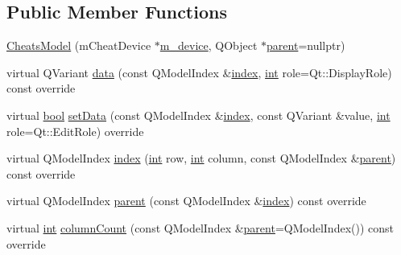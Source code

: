 \subsection*{Public Member Functions}
\begin{DoxyCompactItemize}
\item 
\mbox{\hyperlink{class_q_g_b_a_1_1_cheats_model_ad36f22766ac53d178fde4ec024a56b49}{Cheats\+Model}} (m\+Cheat\+Device $\ast$\mbox{\hyperlink{class_q_g_b_a_1_1_cheats_model_ac06665c1e57cc1b07916887eef1e0352}{m\+\_\+device}}, Q\+Object $\ast$\mbox{\hyperlink{class_q_g_b_a_1_1_cheats_model_a4afdb0b4cf8e3ee616a79ad63bb2e98b}{parent}}=nullptr)
\item 
virtual Q\+Variant \mbox{\hyperlink{class_q_g_b_a_1_1_cheats_model_a694bb3a5ce6c06b6507c230c0a7518b7}{data}} (const Q\+Model\+Index \&\mbox{\hyperlink{class_q_g_b_a_1_1_cheats_model_a55247862e978913005dfae95e0f3753c}{index}}, \mbox{\hyperlink{ioapi_8h_a787fa3cf048117ba7123753c1e74fcd6}{int}} role=Qt\+::\+Display\+Role) const override
\item 
virtual \mbox{\hyperlink{libretro_8h_a4a26dcae73fb7e1528214a068aca317e}{bool}} \mbox{\hyperlink{class_q_g_b_a_1_1_cheats_model_ad74f11015ce75f58c3b89fd12811d6aa}{set\+Data}} (const Q\+Model\+Index \&\mbox{\hyperlink{class_q_g_b_a_1_1_cheats_model_a55247862e978913005dfae95e0f3753c}{index}}, const Q\+Variant \&value, \mbox{\hyperlink{ioapi_8h_a787fa3cf048117ba7123753c1e74fcd6}{int}} role=Qt\+::\+Edit\+Role) override
\item 
virtual Q\+Model\+Index \mbox{\hyperlink{class_q_g_b_a_1_1_cheats_model_a55247862e978913005dfae95e0f3753c}{index}} (\mbox{\hyperlink{ioapi_8h_a787fa3cf048117ba7123753c1e74fcd6}{int}} row, \mbox{\hyperlink{ioapi_8h_a787fa3cf048117ba7123753c1e74fcd6}{int}} column, const Q\+Model\+Index \&\mbox{\hyperlink{class_q_g_b_a_1_1_cheats_model_a4afdb0b4cf8e3ee616a79ad63bb2e98b}{parent}}) const override
\item 
virtual Q\+Model\+Index \mbox{\hyperlink{class_q_g_b_a_1_1_cheats_model_a4afdb0b4cf8e3ee616a79ad63bb2e98b}{parent}} (const Q\+Model\+Index \&\mbox{\hyperlink{class_q_g_b_a_1_1_cheats_model_a55247862e978913005dfae95e0f3753c}{index}}) const override
\item 
virtual \mbox{\hyperlink{ioapi_8h_a787fa3cf048117ba7123753c1e74fcd6}{int}} \mbox{\hyperlink{class_q_g_b_a_1_1_cheats_model_a1ee296f0ef1921c73edacc0decf36103}{column\+Count}} (const Q\+Model\+Index \&\mbox{\hyperlink{class_q_g_b_a_1_1_cheats_model_a4afdb0b4cf8e3ee616a79ad63bb2e98b}{parent}}=Q\+Model\+Index()) const override

\end{DoxyCompactItemize}
